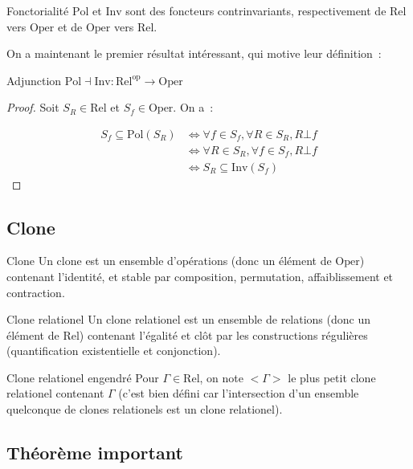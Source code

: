 \documentclass[12pt]{article}
\newcommand\Rel{\text{Rel}}
\newcommand\Oper{\text{Oper}}
\newcommand\Inv{\text{Inv}}
\newcommand\Pol{\text{Pol}}
\begin{document}
\begin{lem}{Fonctorialité}
    $\Pol$ et $\Inv$ sont des foncteurs contrinvariants, respectivement de $\Rel$ vers
    $\Oper$ et de $\Oper$ vers $\Rel$.
\end{lem}

On a maintenant le premier résultat intéressant, qui motive leur définition~:

\begin{theo}{Adjunction}
    $\Pol\dashv\Inv : \Rel^\text{op} \rightarrow \Oper$
\end{theo}
\begin{proof}
    Soit $S_R\in\Rel$ et $S_f\in\Oper$. On a~:

    \begin{align*}
        S_f\subseteq\Pol(S_R) &\iff \forall f\in S_f, \forall R\in S_R, R\bot f \\
                              &\iff \forall R\in S_R, \forall f\in S_f, R\bot f \\
                              &\iff S_R\subseteq\Inv(S_f)
    \end{align*}
\end{proof}

\subsection{Clone}

\begin{defi}{Clone} Un clone est un ensemble d'opérations (donc un élément de $\Oper$)
    contenant l'identité, et stable par composition, permutation, affaiblissement et
    contraction.
\end{defi}

\begin{defi}{Clone relationel} Un clone relationel est un ensemble de relations
    (donc un élément de $\Rel$) contenant l'égalité et clôt par les constructions
    régulières (quantification existentielle et conjonction).
\end{defi}

\begin{defi}{Clone relationel engendré} Pour $\Gamma\in\Rel$, on note $<\Gamma>$ le plus
    petit clone relationel contenant $\Gamma$ (c'est bien défini car l'intersection d'un
    ensemble quelconque de clones relationels est un clone relationel).
\end{defi}

\subsection{Théorème important}
\end{document}
